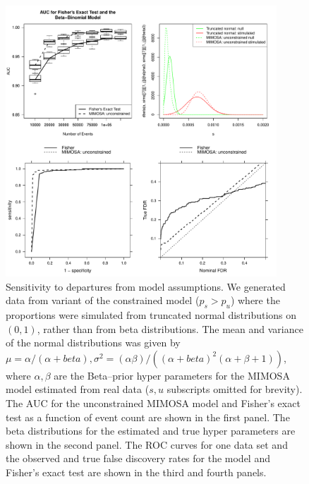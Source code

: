 \documentclass[11pt]{article}
\begin{document}
\begin{figure}[htbp] %
   \centering
   \includegraphics[width=4in]{Figures/simulations_violatedmodel} 
   \caption{Sensitivity to departures from model assumptions. We generated data from variant of the constrained model ($p_s>p_u$) where the proportions were simulated from truncated normal distributions on $(0,1)$, rather than from beta distributions. The mean and variance of the normal distributions was given by $\mu=\alpha/(\alpha+beta), \sigma^2=(\alpha\beta)/((\alpha+beta)^2(\alpha+\beta+1))$, where $\alpha,\beta$ are the Beta--prior hyper parameters for the MIMOSA model estimated from real data ($s, u$ subscripts omitted for brevity). The AUC for the unconstrained MIMOSA model and Fisher's exact test as a function of event count are shown in the first panel. The beta distributions for the estimated and true hyper parameters  are shown in the second panel. The ROC curves for one data set and the observed and true false discovery rates for the model and Fisher's exact test are shown in the third and fourth panels.}
   \label{fig:simulations_trunc}
\end{figure}


\end{document}
